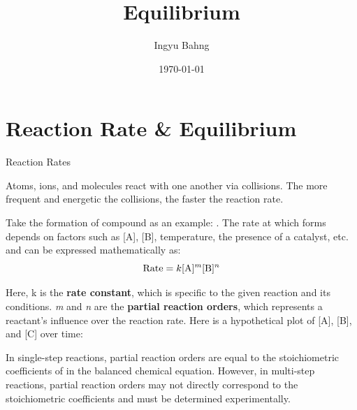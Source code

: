 \documentclass[10pt]{article}
\title{Equilibrium}
\date{\today}
\author{Ingyu Bahng}
\begin{document}


\section{Reaction Rate \& Equilibrium}

  \begin{core}[label=placeholder1]{Reaction Rates}

    Atoms, ions, and molecules react with one another via collisions. The more frequent and energetic the collisions, the faster the reaction rate.

    Take the formation of compound  as an example: . The rate at which  forms depends on factors such as [A], [B], temperature, the presence of a catalyst, etc. and can be expressed mathematically as: 
    \[
      \text{Rate} = k[\ce{A}]^m[\ce{B}]^n
    \]

    Here, k is the \textbf{rate constant}, which is specific to the given reaction and its conditions. \textit{m} and \textit{n} are the \textbf{partial reaction orders}, which represents a reactant's influence over the reaction rate. Here is a hypothetical plot of [A], [B], and [C] over time:

    
    In single-step reactions, partial reaction orders are equal to the stoichiometric coefficients of in the balanced chemical equation. However, in multi-step reactions, partial reaction orders may not directly correspond to the stoichiometric coefficients and must be determined experimentally.

  \end{core}
  
\end{document}
